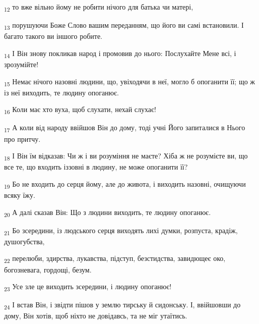 \begin{tcolorbox}
\textsubscript{12} то вже вільно йому не робити нічого для батька чи матері,
\end{tcolorbox}
\begin{tcolorbox}
\textsubscript{13} порушуючи Боже Слово вашим переданням, що його ви самі встановили. І багато такого ви іншого робите.
\end{tcolorbox}
\begin{tcolorbox}
\textsubscript{14} І Він знову покликав народ і промовив до нього: Послухайте Мене всі, і зрозумійте!
\end{tcolorbox}
\begin{tcolorbox}
\textsubscript{15} Немає нічого назовні людини, що, увіходячи в неї, могло б опоганити її; що ж із неї виходить, те людину опоганює.
\end{tcolorbox}
\begin{tcolorbox}
\textsubscript{16} Коли має хто вуха, щоб слухати, нехай слухає!
\end{tcolorbox}
\begin{tcolorbox}
\textsubscript{17} А коли від народу ввійшов Він до дому, тоді учні Його запиталися в Нього про притчу.
\end{tcolorbox}
\begin{tcolorbox}
\textsubscript{18} І Він їм відказав: Чи ж і ви розуміння не маєте? Хіба ж не розумієте ви, що все те, що входить іззовні в людину, не може опоганити її?
\end{tcolorbox}
\begin{tcolorbox}
\textsubscript{19} Бо не входить до серця йому, але до живота, і виходить назовні, очищуючи всяку їжу.
\end{tcolorbox}
\begin{tcolorbox}
\textsubscript{20} А далі сказав Він: Що з людини виходить, те людину опоганює.
\end{tcolorbox}
\begin{tcolorbox}
\textsubscript{21} Бо зсередини, із людського серця виходять лихі думки, розпуста, крадіж, душогубства,
\end{tcolorbox}
\begin{tcolorbox}
\textsubscript{22} перелюби, здирства, лукавства, підступ, безстидства, завидющеє око, богозневага, гордощі, безум.
\end{tcolorbox}
\begin{tcolorbox}
\textsubscript{23} Усе зле це виходить зсередини, і людину опоганює!
\end{tcolorbox}
\begin{tcolorbox}
\textsubscript{24} І встав Він, і звідти пішов у землю тирську й сидонську. І, ввійшовши до дому, Він хотів, щоб ніхто не довідавсь, та не міг утаїтись.
\end{tcolorbox}
